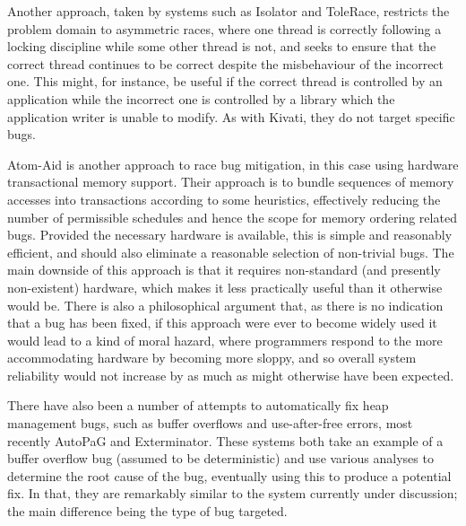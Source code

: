 \documentclass[10pt,a4paper,twocolumn]{article}
\begin{document}
Another approach, taken by systems such as
Isolator\cite{Ramalingam2009} and ToleRace\cite{Kirovski2007},
restricts the problem domain to asymmetric races, where one thread is
correctly following a locking discipline while some other thread is
not, and seeks to ensure that the correct thread continues to be
correct despite the misbehaviour of the incorrect one.  This might,
for instance, be useful if the correct thread is controlled by an
application while the incorrect one is controlled by a library which
the application writer is unable to modify.  As with Kivati, they do
not target specific bugs.

Atom-Aid\cite{Lucia2009} is another approach to race bug
mitigation, in this case using hardware transactional memory support.
Their approach is to bundle sequences of memory accesses into
transactions according to some heuristics, effectively reducing the
number of permissible schedules and hence the scope for memory
ordering related bugs.  Provided the necessary hardware is available,
this is simple and reasonably efficient, and should also eliminate a
reasonable selection of non-trivial bugs.  The main downside of this
approach is that it requires non-standard (and presently non-existent)
hardware, which makes it less practically useful than it otherwise
would be.  There is also a philosophical argument that, as there is no
indication that a bug has been fixed, if this approach were ever to
become widely used it would lead to a kind of moral hazard, where
programmers respond to the more accommodating hardware by becoming
more sloppy, and so overall system reliability would not increase by
as much as might otherwise have been expected.

There have also been a number of attempts to automatically fix heap
management bugs, such as buffer overflows and use-after-free errors,
most recently AutoPaG\cite{Lin2007} and Exterminator\cite{Novark2007}.
These systems both take an example of a buffer overflow bug (assumed
to be deterministic) and use various analyses to determine the root
cause of the bug, eventually using this to produce a potential fix.
In that, they are remarkably similar to the system currently under
discussion; the main difference being the type of bug targeted.
\end{document}
